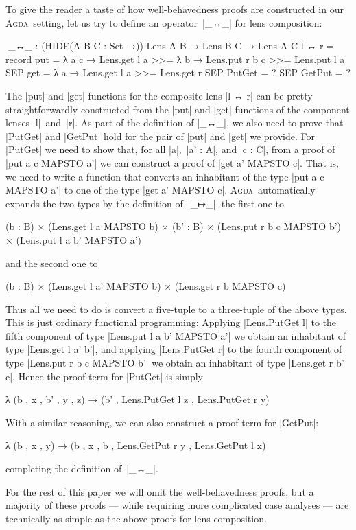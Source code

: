 \documentclass[fleqn]{llncs}
\newcommand{\Agda}{\textsc{Agda}}
\begin{document}
To give the reader a taste of how well-behavedness proofs are constructed in our \Agda\ setting, let us try to define an operator~|_↔_| for lens composition:
\begin{code}
^^^_↔_ : (HIDE({A B C : Set} →)) Lens A B → Lens B C → Lens A C
l ↔ r = record
  {    put  = λ a c → Lens.get l a >>= λ b → Lens.put r b c >>= Lens.put l a
  SEP  get  = λ a → Lens.get l a >>= Lens.get r
  SEP  PutGet = ? SEP GetPut = ? }
\end{code}
The |put| and |get| functions for the composite lens |l ↔ r| can be pretty straightforwardly constructed from the |put| and |get| functions of the component lenses |l|~and~|r|.
As part of the definition of |_↔_|\kern1pt, we also need to prove that |PutGet| and |GetPut| hold for the pair of |put| and |get| we provide.
For |PutGet| we need to show that, for all |a|,~|a' : A|, and |c : C|, from a proof of |put a c MAPSTO a'| we can construct a proof of |get a' MAPSTO c|.
That is, we need to write a function that converts an inhabitant of the type |put a c MAPSTO a'| to one of the type |get a' MAPSTO c|.
\Agda\ automatically expands the two types by the definition of~|_↦_|\kern1pt, the first one to
\begin{code}
(b : B) ×  (Lens.get l a MAPSTO b) ×
           (b' : B) × (Lens.put r b c MAPSTO b') × (Lens.put l a b' MAPSTO a')
\end{code}
and the second one to
\begin{code}
(b : B) × (Lens.get l a' MAPSTO b) × (Lens.get r b MAPSTO c)
\end{code}
Thus all we need to do is convert a five-tuple to a three-tuple of the above types.
This is just ordinary functional programming: Applying |Lens.PutGet l| to the fifth component of type |Lens.put l a b' MAPSTO a'| we obtain an inhabitant of type |Lens.get l a' b'|, and applying |Lens.PutGet r| to the fourth component of type |Lens.put r b c MAPSTO b'| we obtain an inhabitant of type |Lens.get r b' c|.
Hence the proof term for |PutGet| is simply
\begin{code}
λ (b , x , b' , y , z) → (b' , Lens.PutGet l z , Lens.PutGet r y)
\end{code}
With a similar reasoning, we can also construct a proof term for |GetPut|:
\begin{code}
λ (b , x , y) → (b , x , b , Lens.GetPut r y , Lens.GetPut l x)
\end{code}
completing the definition of~|_↔_|\kern1pt.

For the rest of this paper we will omit the well-behavedness proofs, but a majority of these proofs --- while requiring more complicated case analyses --- are technically as simple as the above proofs for lens composition.
\end{document}
